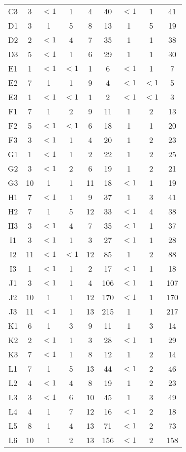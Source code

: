 \begin{center}
\begin{longtable}{ccccc|cccc}
C3&3&$<1$&1&4&40&$<1$&1&41\\
D1&3&1&5&8&13&1&5&19\\
D2&2&$<1$&4&7&35&1&1&38\\
D3&5&$<1$&1&6&29&1&1&30\\
E1&1&$<1$&$<1$&1&6&$<1$&1&7\\
E2&7&1&1&9&4&$<1$&$<1$&5\\
E3&1&$<1$&$<1$&1&2&$<1$&$<1$&3\\
F1&7&1&2&9&11&1&2&13\\
F2&5&$<1$&$<1$&6&18&1&1&20\\
F3&3&$<1$&1&4&20&1&2&23\\
G1&1&$<1$&1&2&22&1&2&25\\
G2&3&$<1$&2&6&19&1&2&21\\
G3&10&1&1&11&18&$<1$&1&19\\
H1&7&$<1$&1&9&37&1&3&41\\
H2&7&1&5&12&33&$<1$&4&38\\
H3&3&$<1$&4&7&35&$<1$&1&37\\
I1&3&$<1$&1&3&27&$<1$&1&28\\
I2&11&$<1$&$<1$&12&85&1&2&88\\
I3&1&$<1$&1&2&17&$<1$&1&18\\
J1&3&$<1$&1&4&106&$<1$&1&107\\
J2&10&1&1&12&170&$<1$&1&170\\
J3&11&$<1$&1&13&215&1&1&217\\
K1&6&1&3&9&11&1&3&14\\
K2&2&$<1$&1&3&28&$<1$&1&29\\
K3&7&$<1$&1&8&12&1&2&14\\
L1&7&1&5&13&44&$<1$&2&46\\
L2&4&$<1$&4&8&19&1&2&23\\
L3&3&$<1$&6&10&45&1&3&49\\
L4&4&1&7&12&16&$<1$&2&18\\
L5&8&1&4&13&71&$<1$&2&73\\
L6&10&1&2&13&156&$<1$&2&158\\
\end{longtable}
\end{center}

